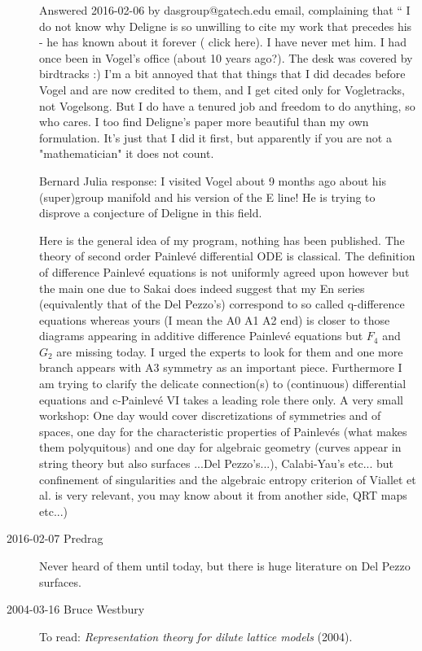 \begin{description}
Answered 2016-02-06 by dasgroup@gatech.edu email,
complaining that `` I do not know why Deligne is so unwilling to cite my
work that precedes his - he has known about it forever
( {click here}). I
have never met him. I had once been in Vogel's office (about 10 years
ago?). The desk was covered by birdtracks :) I'm a bit annoyed that that
things that I did decades before Vogel and are now credited to them, and
I get cited only for Vogletracks, not Vogelsong. But I do have a tenured
job and freedom to do anything, so who cares. I too find Deligne's paper
more beautiful than my own formulation. It's just that I did it first,
but apparently if you are not a "mathematician" it does not count.

Bernard Julia response:
I visited Vogel about 9 months ago about his (super)group manifold and
his version of the E line! He is trying to disprove a conjecture of
Deligne in this field.

Here is the general idea of my program, nothing has been published.
The theory of second order Painlev\'e differential ODE is classical. The
definition of difference Painlev\'e equations is not uniformly agreed upon
however but the main one due to Sakai does indeed suggest that my En
series (equivalently that of the Del Pezzo's) correspond to so called
q-difference equations whereas yours (I mean the A0 A1 A2 end) is closer to
those diagrams appearing in additive difference Painlev\'e equations but $F_4$
and $G_2$ are missing today. I urged the experts to look for them and one more
branch appears with A3 symmetry as an important piece. Furthermore I am
trying to clarify  the delicate connection(s) to (continuous) differential
equations and c-Painlev\'e VI takes a leading role there only.
A very small workshop: One day would cover discretizations of
symmetries and of spaces, one day for the characteristic properties of
Painlev\'es (what makes them polyquitous) and one day for algebraic geometry
(curves appear in string theory but also surfaces ...Del Pezzo's...),
Calabi-Yau's etc... but confinement of singularities and the algebraic
entropy criterion of Viallet et al. is very relevant, you may know about
it from another side, QRT maps etc...)

\item[2016-02-07  Predrag]
Never heard of them until today, but there is huge literature on
 {Del Pezzo
surfaces}.


\item[2004-03-16 Bruce Westbury] To read:
{\em Representation theory for dilute lattice models} (2004).



\end{description}
